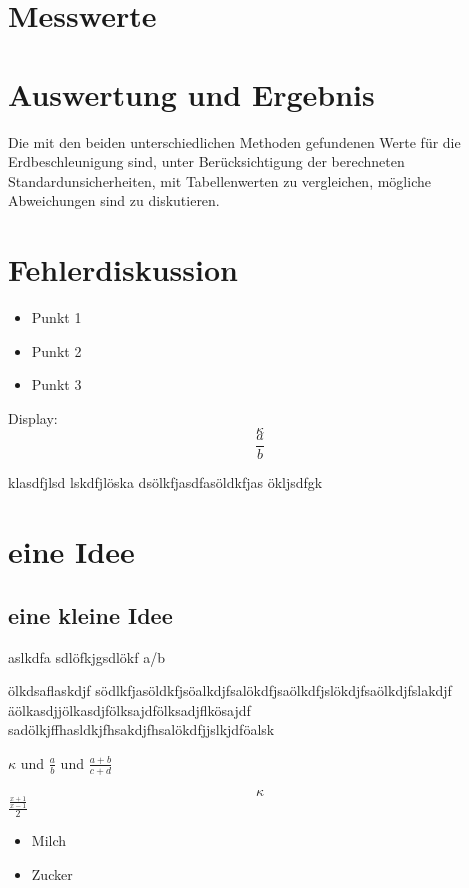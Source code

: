 \documentclass{protokoll}
\begin{document}
\section{Messwerte}

\section{Auswertung und Ergebnis}

Die mit den beiden unterschiedlichen Methoden gefundenen Werte für die Erdbeschleunigung sind,
unter Berücksichtigung der berechneten Standardunsicherheiten, mit Tabellenwerten zu vergleichen,
mögliche Abweichungen sind zu diskutieren.



\section{Fehlerdiskussion}



\begin{itemize}
\item Punkt 1
\item Punkt 2
\item Punkt 3
\end{itemize}

Display:
\begin{equation}
\kappa
\end{equation}
\begin{equation}
\frac{a}{b}
\end{equation}

klasdfjlsd
lskdfjlöska
dsölkfjasdfasöldkfjas
ökljsdfgk

\section{eine Idee}
\subsection{eine kleine Idee}
aslkdfa
sdlöfkjgsdlökf
a/b

ölkdsaflaskdjf
södlkfjasöldkfjsöalkdjfsalökdfjsaölkdfjslökdjfsaölkdjfslakdjf
äölkasdjjölkasdjfölksajdfölksadjflkösajdf
sadölkjffhasldkjfhsakdjfhsalökdfjjslkjdföalsk

$\kappa$ und $\frac{a}{b}$ und $\frac{a + b}{c + d}$

\begin{equation}
\kappa
\end{equation}
$\frac{\frac{x+1}{x-1}}{2}$


\begin{itemize}
\item Milch
\item Zucker
\end{itemize}
\end{document}
